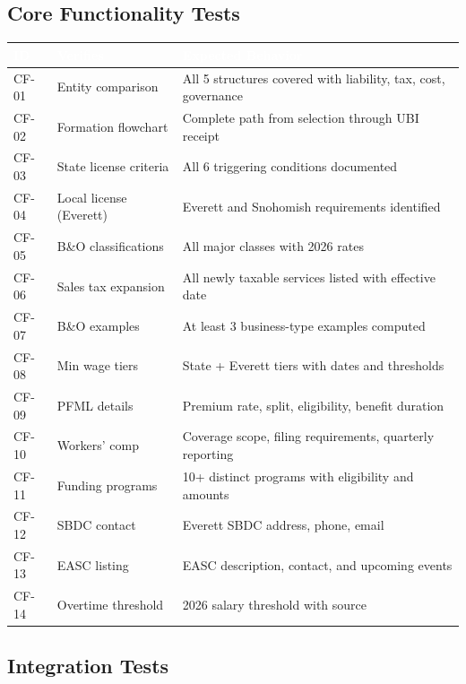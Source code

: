 \documentclass[11pt,letterpaper]{article}
\newcommand{\tableheader}[1]{\textbf{\sffamily\textcolor{white}{#1}}}
\begin{document}
\subsection{Core Functionality Tests}

\begin{center}
\begin{tabularx}{\textwidth}{C{1.2cm}L{3.5cm}X}
\toprule
{}
\tableheader{ID} & \tableheader{Verifies} & \tableheader{Expected Behavior} \\
\midrule
CF-01 & Entity comparison & All 5 structures covered with liability, tax, cost, governance \\
CF-02 & Formation flowchart & Complete path from selection through UBI receipt \\
CF-03 & State license criteria & All 6 triggering conditions documented \\
CF-04 & Local license (Everett) & Everett and Snohomish requirements identified \\
CF-05 & B\&O classifications & All major classes with 2026 rates \\
CF-06 & Sales tax expansion & All newly taxable services listed with effective date \\
CF-07 & B\&O examples & At least 3 business-type examples computed \\
CF-08 & Min wage tiers & State + Everett tiers with dates and thresholds \\
CF-09 & PFML details & Premium rate, split, eligibility, benefit duration \\
CF-10 & Workers' comp & Coverage scope, filing requirements, quarterly reporting \\
CF-11 & Funding programs & 10+ distinct programs with eligibility and amounts \\
CF-12 & SBDC contact & Everett SBDC address, phone, email \\
CF-13 & EASC listing & EASC description, contact, and upcoming events \\
CF-14 & Overtime threshold & 2026 salary threshold with source \\
\bottomrule
\end{tabularx}
\end{center}

\subsection{Integration Tests}
\end{document}
